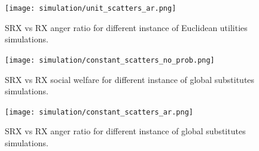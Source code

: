 \documentclass[runningheads]{llncs}
\begin{document}
\begin{subappendices}
\begin{figure}[t]
\begin{center}
\texttt{[image: simulation/unit\_scatters\_ar.png]}
\caption{SRX vs RX anger ratio for different instance of Euclidean utilities simulations.
}\label{fig:scatter_all_ar1}
\end{center}
\end{figure}

\begin{figure}[t]
\begin{center}
\texttt{[image: simulation/constant\_scatters\_no\_prob.png]}
\caption{SRX vs RX social welfare for different instance of global substitutes simulations.
}\label{fig:scatter_all2}
\end{center}
\end{figure}

\begin{figure}[t]
\begin{center}
\texttt{[image: simulation/constant\_scatters\_ar.png]}
\caption{SRX vs RX anger ratio for different instance of global substitutes simulations.
}\label{fig:scatter_all_ar2}
\end{center}
\end{figure}


\end{subappendices}
\end{document}
